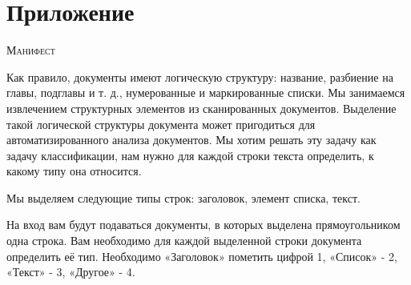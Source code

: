 \documentclass[a4paper,12pt]{article}
\begin{document}
\newpage
\section*{Приложение}

\textsc{\large Манифест}

\vspace{0.5cm}

Как правило, документы имеют логическую структуру: название, разбиение на главы, подглавы и т. д., нумерованные и маркированные списки. Мы занимаемся извлечением структурных элементов из сканированных документов. Выделение такой логической структуры документа может пригодиться для автоматизированного анализа документов. Мы хотим решать эту задачу как задачу классификации, нам нужно для каждой строки текста определить, к какому типу она относится.

Мы выделяем следующие типы строк: заголовок, элемент списка, текст.

На вход вам будут подаваться документы, в которых выделена прямоугольником одна строка. Вам необходимо для каждой выделенной строки документа определить её тип. Необходимо «Заголовок» пометить цифрой 1, «Список» - 2, «Текст» - 3, «Другое» - 4.
\end{document}
